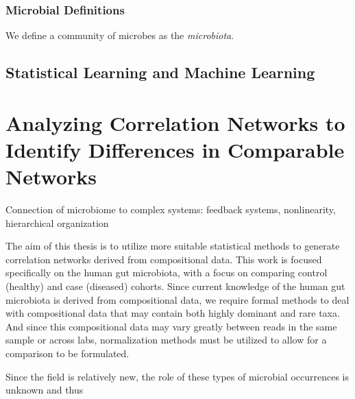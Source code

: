 \subsubsection{Microbial Definitions}\label{intro-mic-def}

We define a community of microbes as the \textit{microbiota}.


\subsection{Statistical Learning and Machine Learning} \label{intro-statml}


\section{Analyzing Correlation Networks to Identify Differences in Comparable Networks}\label{intro-overall}

Connection of microbiome to complex systems: feedback systems, nonlinearity, hierarchical organization 

The aim of this thesis is to utilize more suitable statistical methods to generate correlation networks derived from compositional data. This work is focused specifically on the human gut microbiota, with a focus on comparing control (healthy) and case (diseased) cohorts. Since current knowledge of the human gut microbiota is derived from compositional data, we require formal methods to deal with compositional data that may contain both highly dominant and rare taxa. And since this compositional data may vary greatly between reads in the same sample or across labs, normalization methods must be utilized to allow for a comparison to be formulated.

Since the field is relatively new, the role of these types of microbial occurrences is unknown and thus  

